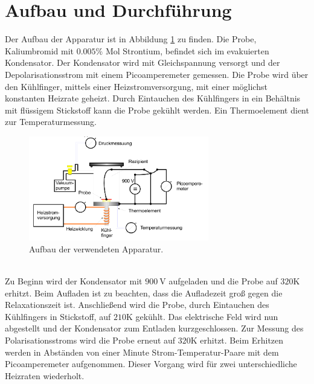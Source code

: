 \section{Aufbau und Durchführung}
\label{sec:Durchführung}
Der Aufbau der Apparatur ist in Abbildung \ref{fig:aufbau}
zu finden. Die Probe, Kaliumbromid mit $0.005\%$ Mol Strontium,
befindet sich im evakuierten Kondensator.
Der Kondensator wird mit Gleichspannung versorgt und der Depolarisationsstrom mit einem Picoamperemeter gemessen.
Die Probe wird über den Kühlfinger, mittels einer Heizstromversorgung, mit einer möglichst konstanten
Heizrate geheizt.
Durch Eintauchen des Kühlfingers in ein Behältnis mit flüssigem Stickstoff kann die Probe gekühlt
werden. Ein Thermoelement dient zur Temperaturmessung.
\begin{figure}
    \centering
    \includegraphics[width=0.7\textwidth]{aufbau.PNG}
    \caption{Aufbau der verwendeten Apparatur.\cite{skript}}
    \label{fig:aufbau}
\end{figure}\\
Zu Beginn wird der Kondensator mit $900\ \si{\volt}$ aufgeladen und die Probe auf $320\mathrm{K}$ erhitzt.
Beim Aufladen ist zu beachten, dass die Aufladezeit groß gegen die Relaxationszeit ist.
Anschließend wird die Probe, durch Eintauchen des Kühlfingers in Stickstoff,
auf $210\mathrm{K}$ gekühlt.
Das elektrische Feld wird nun abgestellt und der Kondensator zum Entladen kurzgeschlossen.
Zur Messung des Polarisationsstroms wird die Probe erneut auf $320\mathrm{K}$ erhitzt.
Beim Erhitzen werden in Abständen von einer Minute Strom-Temperatur-Paare mit dem Picoamperemeter aufgenommen.
Dieser Vorgang wird für zwei unterschiedliche Heizraten wiederholt.
